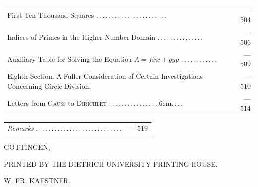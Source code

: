 \begin{longtable}{@{}>{\raggedright\arraybackslash}p{.86\linewidth}@{\quad}r@{}}
First Ten Thousand Squares .\,.\,.\,.\,.\,.\,.\,.\,.\,.\,.\,.\,.\,.\,.\,.\,.\,.\,.\,.\,.\,.\,. & — 504 \\[3pt]
Indices of Primes in the Higher Number Domain .\,.\,.\,.\,.\,.\,.\,.\,.\,,\,.\,.\,.\,.\,. & — 506 \\[3pt]
Auxiliary Table for Solving the Equation $A=fxx+gyy$ .\,.\,.\,.\,.\,.\,.\,.\,.\,.\,.\,. & — 509 \\[3pt]
Eighth Section. A Fuller Consideration of Certain Investigations Concerning Circle Division.  & — 510 \\[3pt]
Letters from \textsc{Gauss} to \textsc{Dirichlet} .\,.\,.\,.\,.\,.\,.\,.\,.\,.\,.\,.\,.\,.\,.\,.\kern.6em.\,.\,.\,. & — 514 \\[3pt]
\end{longtable}\endgroup
\begingroup\fontsize{10}{13}\selectfont
\begin{longtable}{@{}>{\raggedright\arraybackslash}p{.86\linewidth}@{\quad}r@{}}
\textit{Remarks} .\,.\,.\,.\,.\,.\,.\,.\,.\,.\,.\,.\,.\,.\,.\,.\,.\,.\,.\,.\,.\,.\,.\,.\,.\,.\,.\,. & — 519 \\[3pt]
\end{longtable}\endgroup
{}
\begin{center}
GÖTTINGEN,\par\smallskip
PRINTED BY THE DIETRICH UNIVERSITY PRINTING HOUSE.\par\smallskip
W. FR. KAESTNER.
\end{center}
